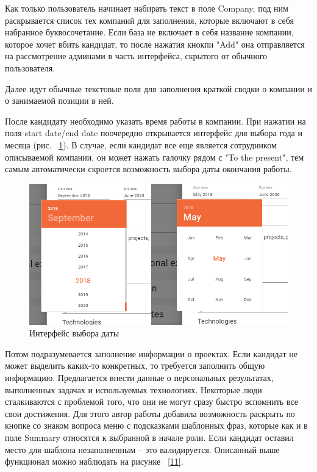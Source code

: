 \documentclass[12pt, a4paper]{diplom}
\begin{document}
Как только пользователь начинает набирать текст в поле Company, под ним раскрывается список тех компаний для заполнения, которые включают в себя набранное буквосочетание.
Если база не включает в себя название компании, которое хочет вбить кандидат, то после нажатия кнокпи "Add" она
отправляется на рассмотрение админами в часть интерфейса, скрытого от обычного пользователя.

Далее идут обычные текстовые поля для заполнения краткой сводки о компании и о занимаемой позиции в ней.

После кандидату необходимо указать время работы в компании. При нажатии на поля start date/end date поочередно открывается интерфейс для выбора года и месяца (рис. ~\ref{10}).
В случае, если кандидат все еще является сотрудником описываемой компании, он может нажать галочку рядом с "To the present", тем самым автоматически скроется возможность выбора даты окончания работы.

\begin{figure}[!ht]
\centering
\includegraphics[width=1\textwidth]{resources/dates.png}
\caption{Интерфейс выбора даты}
\label{10}
\end{figure}

Потом подразумевается заполнение информации о проектах. Если кандидат не может выделить каких-то конкретных, то требуется заполнить общую информацию. Предлагается внести данные о персональных результатах, выполненных задачах и используемых технологиях.
Некоторые люди сталкиваются с проблемой того, что они не могут сразу быстро вспомнить все свои достижения.
Для этого автор работы добавила возможность раскрыть по кнопке со знаком вопроса меню с подсказками шаблонных фраз, которые как и в поле Summary относятся к выбранной в начале роли. Если кандидат оставил место для шаблона незаполненным -- это валидируется.
Описанный выше функционал можно наблюдать на рисунке ~\ref{11}.
\end{document}
